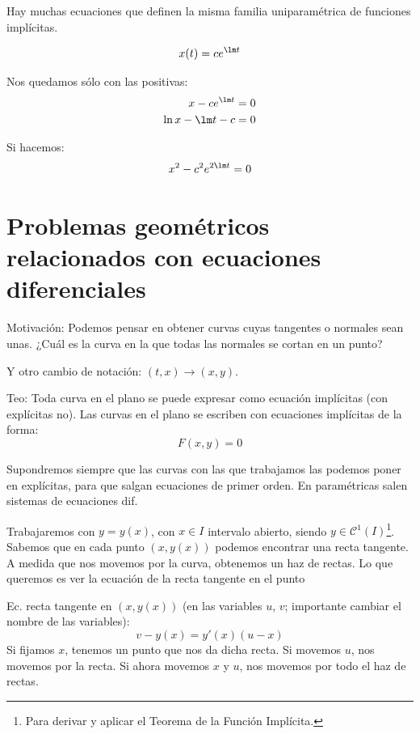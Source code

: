 Hay muchas ecuaciones que definen la misma familia uniparamétrica de funciones implícitas.
\begin{ejemplo}
    \begin{equation*}
        x(t) = c e^{\lm t}
    \end{equation*}

    Nos quedamos sólo con las positivas:
    \begin{align*}
        x-ce^{\lm t} &= 0 \\
        \ln x - \lm t - c &= 0
    \end{align*}

    Si hacemos:
    \begin{equation*}
        x^2-c^2 e^{2\lm t} = 0
    \end{equation*}
\end{ejemplo}

\section{Problemas geométricos relacionados con ecuaciones diferenciales}
Motivación:
Podemos pensar en obtener curvas cuyas tangentes o normales sean unas.
¿Cuál es la curva en la que todas las normales se cortan en un punto?

Y otro cambio de notación: $(t,x) \rightarrow (x,y)$.

Teo: Toda curva en el plano se puede expresar como ecuación implícitas (con explícitas no).
Las curvas en el plano se escriben con ecuaciones implícitas de la forma:
\begin{equation*}
    F(x,y) = 0
\end{equation*}

Supondremos siempre que las curvas con las que trabajamos las podemos poner en explícitas, para que salgan ecuaciones de primer orden.
En paramétricas salen sistemas de ecuaciones dif.

Trabajaremos con $y=y(x)$, con $x\in I$ intervalo abierto, siendo $y\in \mathcal{C}^1(I)$\footnote{Para derivar y aplicar el Teorema de la Función Implícita.}.\\

Sabemos que en cada punto $(x,y(x))$ podemos encontrar una recta tangente. A medida que nos movemos por la curva, obtenemos un haz de rectas. Lo que queremos es ver la ecuación de la recta tangente en el punto

Ec. recta tangente en $(x,y(x))$ (en las variables $u$, $v$; importante cambiar el nombre de las variables):
\begin{equation*}
    v-y(x) = y'(x) (u-x)
\end{equation*}
Si fijamos $x$, tenemos un punto que nos da dicha recta. Si movemos $u$, nos movemos por la recta. Si ahora movemos $x$ y $u$, nos movemos por todo el haz de rectas.



